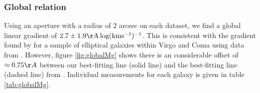 		\subsubsection{Global relation}
			Using an aperture with a radius of 2 arcsec on each dataset, we find a global linear gradient of $2.7\pm1.9 \mathrm{\AA \, log(km s^{-1})^{-1}}$. This is consistent with the gradient found by \citet{Ziegler1997} for a sample of elliptical galaxies within Virgo and Coma using data from \citet{Dressler1987}. However, figure \ref{fig:globalMg} shows there is an considerable offset of $\approx0.75\AA$ between our best-fitting line (solid line) and the best-fitting line (dashed line) from \citet{Ziegler1997}. Individual measurements for each galaxy is given in table \ref{tab:globalMg}.

